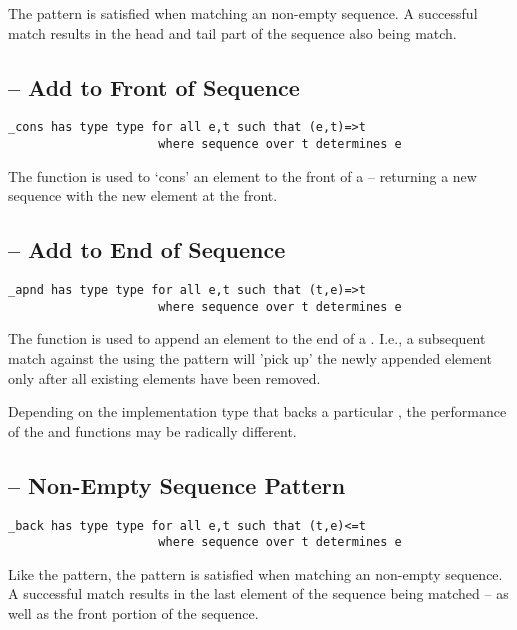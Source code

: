 The  pattern is satisfied when matching an non-empty sequence. A successful match results in the head and tail part of the sequence also being match.

\subsection{ -- Add to Front of Sequence}
\label{consFunction}
\begin{lstlisting}
_cons has type type for all e,t such that (e,t)=>t
                     where sequence over t determines e
\end{lstlisting}
The  function is used to `cons' an element to the front of a  -- returning a new sequence with the new element at the front.

\subsection{ -- Add to End of Sequence}
\label{appendFunction}
\begin{lstlisting}
_apnd has type type for all e,t such that (t,e)=>t
                     where sequence over t determines e
\end{lstlisting}
The  function is used to append an element to the end of a . I.e., a subsequent match against the  using the  pattern will 'pick up' the newly appended element only after all existing elements have been removed.

\begin{aside}
Depending on the implementation type that backs a particular , the performance of the  and  functions may be radically different.
\end{aside}

\subsection{ -- Non-Empty Sequence Pattern}
\label{backPattern}
\begin{lstlisting}
_back has type type for all e,t such that (t,e)<=t
                     where sequence over t determines e
\end{lstlisting}

Like the  pattern, the  pattern is satisfied when matching an non-empty sequence. A successful match results in the last element of the sequence being matched -- as well as the front portion of the sequence.

